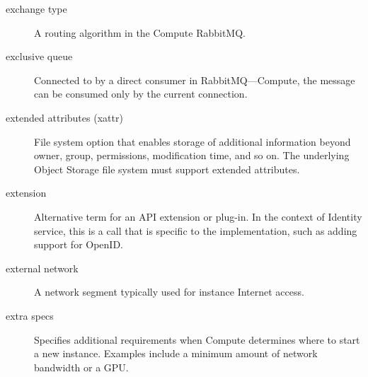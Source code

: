 \documentclass[letterpaper,10pt,english]{sphinxmanual}
\begin{document}
\begin{description}
\item[{exchange type}] \leavevmode{}\label{_source/glossary:term-exchange-type}
A routing algorithm in the Compute RabbitMQ.

\item[{exclusive queue}] \leavevmode{}\label{_source/glossary:term-exclusive-queue}
Connected to by a direct consumer in RabbitMQ—Compute, the
message can be consumed only by the current connection.

\item[{extended attributes (xattr)}] \leavevmode{}\label{_source/glossary:term-extended-attributes-xattr}
File system option that enables storage of additional
information beyond owner, group, permissions, modification time, and
so on. The underlying Object Storage file system must support extended
attributes.

\item[{extension}] \leavevmode{}\label{_source/glossary:term-extension}
Alternative term for an API extension or plug-in. In the context
of Identity service, this is a call that is specific to the
implementation, such as adding support for OpenID.

\item[{external network}] \leavevmode{}\label{_source/glossary:term-external-network}
A network segment typically used for instance Internet
access.

\item[{extra specs}] \leavevmode{}\label{_source/glossary:term-extra-specs}
Specifies additional requirements when Compute determines where
to start a new instance. Examples include a minimum amount of network
bandwidth or a GPU.

\end{description}
\end{document}
